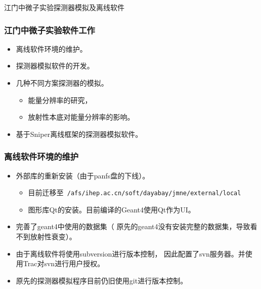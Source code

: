 
\begin{frame}
    \begin{center}
        \LARGE 江门中微子实验探测器模拟及离线软件
    \end{center}
\end{frame}

\begin{frame}
    \frametitle{江门中微子实验软件工作}
    \begin{itemize}
        \item 离线软件环境的维护。
        \item 探测器模拟软件的开发。
        \item 几种不同方案探测器的模拟。
            \begin{itemize}
                \item 能量分辨率的研究，
                \item 放射性本底对能量分辨率的影响。
            \end{itemize}
        \item 基于Sniper离线框架的探测器模拟软件。
    \end{itemize}
\end{frame}

\begin{frame}
    \frametitle{离线软件环境的维护}
    \begin{itemize}
        \item 外部库的重新安装（由于panfs盘的下线）。
            \begin{itemize}
                \item 目前迁移至{\tt
                    /afs/ihep.ac.cn/soft/dayabay/jmne/external/local}
                \item 图形库Qt的安装。目前编译的Geant4使用Qt作为UI。
            \end{itemize}
        \item 完善了geant4中使用的数据集（
              原先的geant4没有安装完整的数据集，导致看不到放射性衰变）。
        \item 由于离线软件将使用subversion进行版本控制，
              因此配置了svn服务器。并使用Trac对svn进行用户授权。
        \item 原先的探测器模拟程序目前仍旧使用git进行版本控制。
    \end{itemize}
\end{frame}

